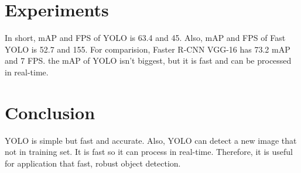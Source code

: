 \documentclass[extendedabs]{bmvc2k}
\begin{document}
\section{Experiments}
In short, mAP and FPS of YOLO is 63.4 and 45. Also, mAP and FPS of Fast YOLO is 52.7 and 155. For comparision, Faster R-CNN\cite{fasterrcnn} VGG-16 has 73.2 mAP and 7 FPS. the mAP of YOLO isn't biggest, but it is fast and can be processed in real-time.

\section{Conclusion}
YOLO is simple but fast and accurate. Also, YOLO can detect a new image that not in training set. It is fast so it can process in real-time. Therefore, it is useful for application that fast, robust object detection.

\newpage

\end{document}

